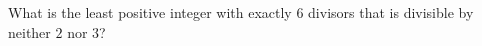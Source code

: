What is the least positive integer with exactly $6$ divisors that is divisible by neither $2$ nor $3$?
